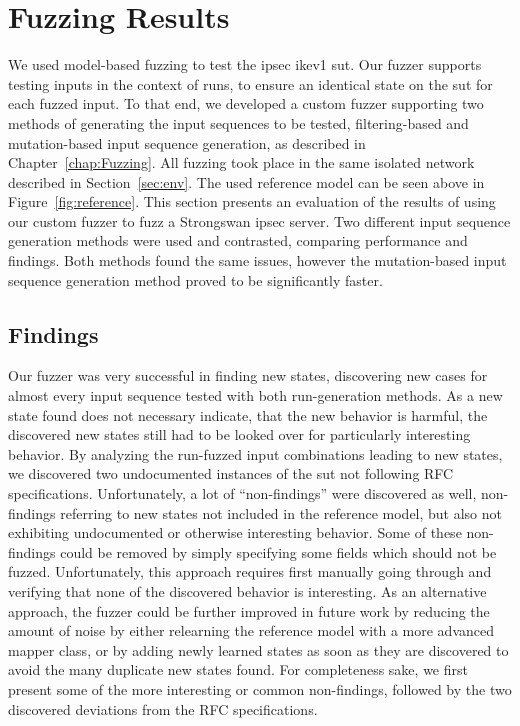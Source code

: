\section{Fuzzing Results} \label{sec:fuzzresults}
We used model-based fuzzing to test the \ac{ipsec} \ac{ike}v1 \ac{sut}. Our fuzzer supports testing inputs in the context of runs, to ensure an identical state on the \ac{sut} for each fuzzed input. To that end, we developed a custom fuzzer supporting two methods of generating the input sequences to be tested, filtering-based and mutation-based input sequence generation, as described in Chapter~\ref{chap:Fuzzing}. All fuzzing took place in the same isolated network described in Section~\ref{sec:env}. The used reference model can be seen above in Figure~\ref{fig:reference}. This section presents an evaluation of the results of using our custom fuzzer to fuzz a Strongswan \ac{ipsec} server. Two different input sequence generation methods were used and contrasted, comparing performance and findings. Both methods found the same issues, however the mutation-based input sequence generation method proved to be significantly faster.

\subsection{Findings} \label{subsec:findings}
Our fuzzer was very successful in finding new states, discovering new cases for almost every input sequence tested with both run-generation methods. As a new state found does not necessary indicate, that the new behavior is harmful, the discovered new states still had to be looked over for particularly interesting behavior. By analyzing the run-fuzzed input combinations leading to new states, we discovered two undocumented instances of the \ac{sut} not following RFC specifications. Unfortunately, a lot of ``non-findings'' were discovered as well, non-findings referring to new states not included in the reference model, but also not exhibiting undocumented or otherwise interesting behavior. Some of these non-findings could be removed by simply specifying some fields which should not be fuzzed. Unfortunately, this approach requires first manually going through and verifying that none of the discovered behavior is interesting. As an alternative approach, the fuzzer could be further improved in future work by reducing the amount of noise by either relearning the reference model with a more advanced mapper class, or by adding newly learned states as soon as they are discovered to avoid the many duplicate new states found. 
For completeness sake, we first present some of the more interesting or common non-findings, followed by the two discovered deviations from the RFC specifications. 

